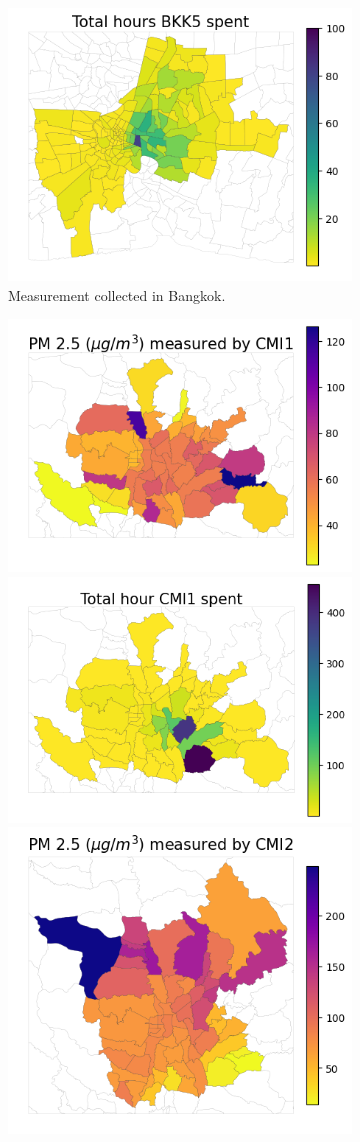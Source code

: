 \begin{figure}
\begin{subfigure}[t]{0.49\textwidth}
        \includegraphics[width=.49\linewidth]{figures/map/BKK5_time.png}
        \caption{Measurement collected in Bangkok.}
    \end{subfigure}%
    \hfill%
    \begin{subfigure}[t]{0.49\textwidth}
        \centering
        \includegraphics[width=.49\linewidth]{figures/map/CMI1_PM25.png}%
        \includegraphics[width=.49\linewidth]{figures/map/CMI1_time.png}
        \includegraphics[width=.49\linewidth]{figures/map/CMI2_PM25.png}%

\end{subfigure}
\end{figure}
